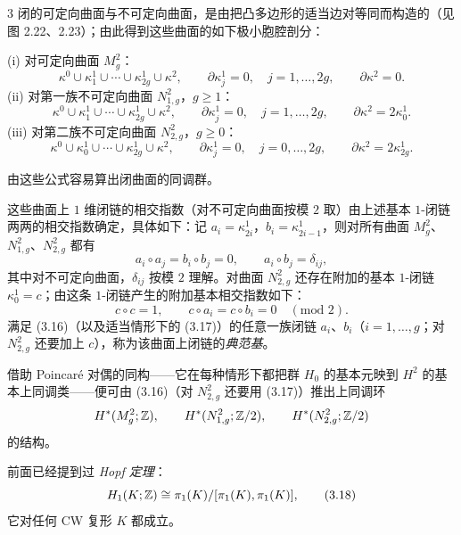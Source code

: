 \begin{example}{3}
闭的可定向曲面与不可定向曲面，是由把凸多边形的适当边对等同而构造的（见图 2.22、2.23）；由此得到这些曲面的如下极小胞腔剖分：

(i) 对可定向曲面 $M_g^2$：
\[
  \kappa^0\cup\kappa_1^1\cup\cdots\cup\kappa_{2g}^1\cup\kappa^2,\qquad
  \partial\kappa_j^1=0,\quad j=1,\dots,2g,\qquad \partial\kappa^2=0.
\]
(ii) 对第一族不可定向曲面 $N_{1,g}^2$，$g\ge1$：
\[
  \kappa^0\cup\kappa_1^1\cup\cdots\cup\kappa_{2g}^1\cup\kappa^2,\qquad
  \partial\kappa_j^1=0,\quad j=1,\dots,2g,\qquad \partial\kappa^2=2\kappa_0^1.
\]
(iii) 对第二族不可定向曲面 $N_{2,g}^2$，$g\ge0$：
\[
  \kappa^0\cup\kappa_0^1\cup\cdots\cup\kappa_{2g}^1\cup\kappa^2,\qquad
  \partial\kappa_j^1=0,\quad j=0,\dots,2g,\qquad \partial\kappa^2=2\kappa_{2g}^1.
\]

由这些公式容易算出闭曲面的同调群。

这些曲面上 $1$ 维闭链的相交指数（对不可定向曲面按模 $2$ 取）由上述基本 $1$-闭链两两的相交指数确定，具体如下：记 $a_i=\kappa_{2i}^1$，$b_i=\kappa_{2i-1}^1$，则对所有曲面 $M_g^2$、$N_{1,g}^2$、$N_{2,g}^2$ 都有
\begin{equation}
  a_i\circ a_j=b_i\circ b_j=0,\qquad a_i\circ b_j=\delta_{ij}, \tag{3.16}
\end{equation}
其中对不可定向曲面，$\delta_{ij}$ 按模 $2$ 理解。对曲面 $N_{2,g}^2$ 还存在附加的基本 $1$-闭链 $\kappa_0^1=c$；由这条 $1$-闭链产生的附加基本相交指数如下：
\begin{equation}
  c\circ c=1,\qquad c\circ a_i=c\circ b_i=0\quad(\text{mod }2). \tag{3.17}
\end{equation}
满足 (3.16)（以及适当情形下的 (3.17)）的任意一族闭链 $a_i$、$b_i$（$i=1,\dots,g$；对 $N_{2,g}^2$ 还要加上 $c$），称为该曲面上闭链的\emph{典范基}。

借助 Poincaré 对偶的同构——它在每种情形下都把群 $H_0$ 的基本元映到 $H^2$ 的基本上同调类——便可由 (3.16)（对 $N_{2,g}^2$ 还要用 (3.17)）推出上同调环
\[
  H^*(M_g^2;\mathbb{Z}),\qquad H^*(N_{1,g}^2;\mathbb{Z}/2),\qquad H^*(N_{2,g}^2;\mathbb{Z}/2)
\]
的结构。
\end{example}

前面已经提到过 \emph{Hopf 定理}：
\begin{equation}
  H_1(K;\mathbb{Z})\cong\pi_1(K)/[\pi_1(K),\pi_1(K)], \tag{3.18}
\end{equation}
它对任何 CW 复形 $K$ 都成立。

